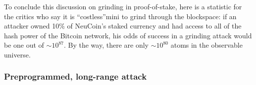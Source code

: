 \documentclass[a4paper,11pt]{article}
\begin{document}




To conclude this discussion on grinding in proof-of-stake, here is a statistic for the critics who say it is ``costless''mini to grind through the blockspace: if an attacker owned 10\% of NeuCoin's staked currency and had access to all of the hash power of the Bitcoin network, his odds of success in a grinding attack would be one out of $\sim10^{87}$. By the way, there are only $\sim10^{80}$ atoms in the observable universe.


\subsubsection{Preprogrammed, long-range attack}
\label{334}
\end{document}
